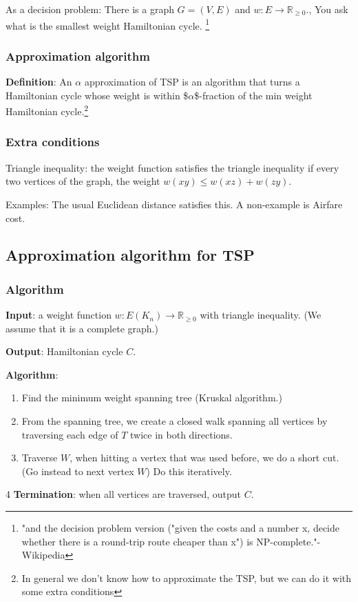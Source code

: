\documentclass[11pt]{article}
\def\R{\mathbb{R}}
\begin{document}
As a decision problem: There is a graph \(G = (V, E)\) and \(w\colon E
   \rightarrow \R_{\ge 0}\)., You ask what is the smallest weight Hamiltonian cycle. \footnote{"and the decision problem version ("given the costs and a number x, decide
whether there is a round-trip route cheaper than x") is NP-complete."-Wikipedia}
\subsubsection{Approximation algorithm}
\label{sec:org6c9d789}
\textbf{Definition}: An \(\alpha\) approximation of TSP is an algorithm that turns a
 Hamiltonian cycle whose weight is within \$\(\alpha\)\$-fraction of the min
 weight Hamiltonian cycle.\footnote{In general we don't know how to approximate the TSP, but we can do it with some extra conditions}
\subsubsection{Extra conditions}
\label{sec:orge2c3ebc}
Triangle inequality: the weight function satisfies the triangle inequality
if every two vertices of the graph, the weight \(w(xy) \le w(xz) + w(zy)\).

Examples: The usual Euclidean distance satisfies this. 
A non-example is Airfare cost.
\subsection{Approximation algorithm for TSP}
\label{sec:orgce86715}
\subsubsection{Algorithm}
\label{sec:org810c24d}
\textbf{Input}: a weight function \(w\colon E(K_n) \rightarrow \R_{\ge 0}\) with
triangle inequality. (We assume that it is a complete graph.)

\textbf{Output}: Hamiltonian cycle \(C\).

\textbf{Algorithm}:
\begin{enumerate}
\item Find the minimum weight spanning tree (Kruskal algorithm.)
\item From the spanning tree, we create a closed walk spanning all vertices by
traversing each edge of \(T\) twice in both directions.
\item Traverse \(W\), when hitting a vertex that was used before, we do a short
cut. (Go instead to next vertex \(W\)) Do this iteratively.
\end{enumerate}
4 \textbf{Termination}: when all vertices are traversed, output \(C\). 
\end{document}
